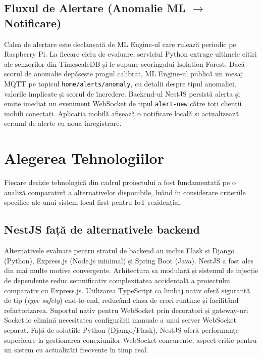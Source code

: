 \documentclass[12pt, twoside, a4paper]{report}
\begin{document}
\subsection{Fluxul de Alertare (Anomalie ML $\rightarrow$ Notificare)}

Calea de alertare este declanșată de ML Engine-ul care rulează periodic pe Raspberry Pi.
La fiecare ciclu de evaluare, serviciul Python extrage ultimele citiri ale senzorilor din
TimescaleDB și le supune scoringului Isolation Forest. Dacă scorul de anomalie depășește
pragul calibrat, ML Engine-ul publică un mesaj MQTT pe topicul \texttt{home/alerts/anomaly},
cu detalii despre tipul anomaliei, valorile implicate și scorul de încredere. Backend-ul
NestJS persistă alerta și emite imediat un eveniment WebSocket de tipul \texttt{alert-new}
către toți clienții mobili conectați. Aplicația mobilă afișează o notificare locală și
actualizează ecranul de alerte cu noua înregistrare.

\section{Alegerea Tehnologiilor}

Fiecare decizie tehnologică din cadrul proiectului a fost fundamentată pe o analiză
comparativă a alternativelor disponibile, luând în considerare criteriile specifice
ale unui sistem local-first pentru IoT rezidențial.

\subsection{NestJS față de alternativele backend}

Alternativele evaluate pentru stratul de backend au inclus Flask și Django (Python),
Express.js (Node.js minimal) și Spring Boot (Java). NestJS a fost ales din mai multe
motive convergente. Arhitectura sa modulară și sistemul de injecție de dependențe reduc
semnificativ complexitatea accidentală a proiectului comparativ cu Express.js. Utilizarea
TypeScript ca limbaj nativ oferă siguranță de tip (\textit{type safety}) end-to-end,
reducând clasa de erori runtime și facilitând refactorizarea. Suportul nativ pentru
WebSocket prin decoratori și gateway-uri Socket.io elimină necesitatea configurării
manuale a unui server WebSocket separat. Față de soluțiile Python (Django/Flask), NestJS
oferă performanțe superioare la gestionarea conexiunilor WebSocket concurente, aspect
critic pentru un sistem cu actualizări frecvente în timp real.
\end{document}
